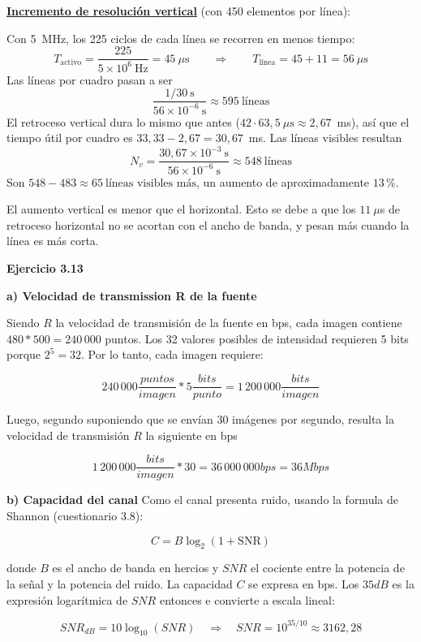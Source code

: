 \documentclass[11pt,a4paper]{article}
\begin{document}
\noindent\underline{\textbf{Incremento de resolución vertical}} (con 450 elementos por línea):

Con 5~MHz, los 225 ciclos de cada línea se recorren en menos tiempo:
\[
  T_{\text{activo}} = \frac{225}{5 \times 10^6~\text{Hz}} = 45~\mu\text{s}
  \qquad\Longrightarrow\qquad
  T_{\text{línea}} = 45 + 11 = 56~\mu\text{s}
\]
Las líneas por cuadro pasan a ser
\[
  \frac{1/30~\text{s}}{56 \times 10^{-6}~\text{s}} \approx 595~\text{líneas}
\]
El retroceso vertical dura lo mismo que antes ($42 \cdot 63{,}5~\mu\text{s} \approx 2{,}67$~ms), así que el tiempo útil por cuadro es $33{,}33 - 2{,}67 = 30{,}67$~ms. Las líneas visibles resultan
\[
  N_v = \frac{30{,}67 \times 10^{-3}~\text{s}}{56 \times 10^{-6}~\text{s}} \approx 548~\text{líneas}
\]
Son $548 - 483 \approx \boxed{65~\text{líneas visibles más}}$, un aumento de aproximadamente $13\,\%$.

El aumento vertical es menor que el horizontal. Esto se debe a que los $11~\mu$s de retroceso horizontal no se acortan con el ancho de banda, y pesan más cuando la línea es más corta.

\vspace{0.3cm}
\noindent\textbf{Ejercicio 3.13}\par
\noindent\textbf{a) Velocidad de transmission R de la fuente}\par
Siendo $R$ la velocidad de transmisión de la fuente en bps, cada imagen contiene $480*500=240\,000$ puntos. Los 32 valores posibles de intensidad requieren 5 bits porque $2^5=32$. Por lo tanto, cada imagen requiere:

$$240\,000\frac{puntos}{imagen}*5\frac{bits}{punto}=1\,200\,000\frac{bits}{imagen}$$

Luego, segundo suponiendo que se envían 30 imágenes por segundo, resulta la velocidad de transmisión $R$ la siguiente en bps

$$1\,200\,000\frac{bits}{imagen}*30=36\,000\,000bps=36Mbps$$


\noindent\textbf{b) Capacidad del canal}
Como el canal presenta ruido, usando la formula de Shannon (cuestionario 3.8):

\[
  C = B\log_2\!\left(1+\mathrm{SNR}\right) 
\]

donde $B$ es el ancho de banda en hercios y $SNR$ el cociente entre la potencia de la señal y la potencia del ruido. La capacidad $C$ se expresa en bps. Los $35dB$ es la expresión logarítmica de $SNR$ entonces e convierte a escala lineal:

$$SNR_{dB}=10\log_{10}(SNR) \quad\Longrightarrow\quad SNR=10^{35/10}\approx3162,28$$
\end{document}
